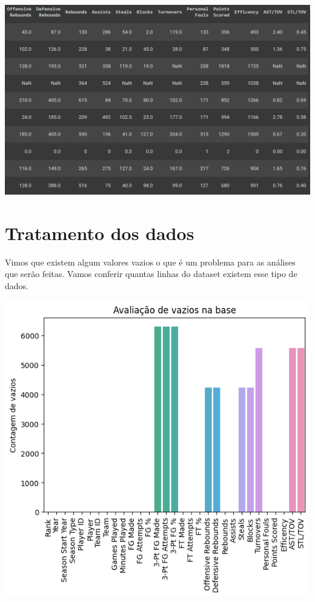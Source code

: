 \documentclass[
]{book}
\begin{document}
\includegraphics{imagens/dataframe2.png}

\hypertarget{tratamento-dos-dados}{%
\section{Tratamento dos dados}\label{tratamento-dos-dados}}

Vimos que existem algum valores vazios o que é um problema para as análises que serão feitas. Vamos conferir quantas linhas do dataset existem esse tipo de dados.

\includegraphics{imagens/1.png}
\end{document}
